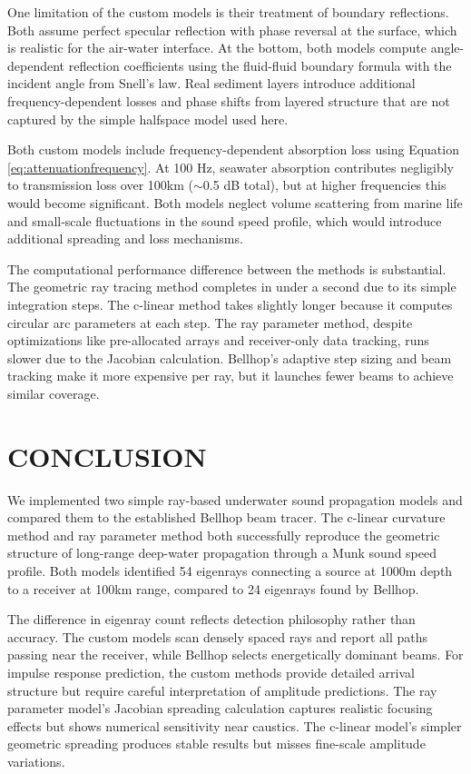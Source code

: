 \documentclass[fleqn]{jaes}
\begin{document}
One limitation of the custom models is their treatment of boundary reflections. Both assume perfect specular reflection with phase reversal at the surface, which is realistic for the air-water interface. At the bottom, both models compute angle-dependent reflection coefficients using the fluid-fluid boundary formula with the incident angle from Snell's law. Real sediment layers introduce additional frequency-dependent losses and phase shifts from layered structure that are not captured by the simple halfspace model used here.

Both custom models include frequency-dependent absorption loss using Equation \ref{eq:attenuationfrequency}. At 100 Hz, seawater absorption contributes negligibly to transmission loss over 100km ($\sim$0.5 dB total), but at higher frequencies this would become significant. Both models neglect volume scattering from marine life and small-scale fluctuations in the sound speed profile, which would introduce additional spreading and loss mechanisms.

The computational performance difference between the methods is substantial. The geometric ray tracing method completes in under a second due to its simple integration steps. The c-linear method takes slightly longer because it computes circular arc parameters at each step. The ray parameter method, despite optimizations like pre-allocated arrays and receiver-only data tracking, runs slower due to the Jacobian calculation. Bellhop's adaptive step sizing and beam tracking make it more expensive per ray, but it launches fewer beams to achieve similar coverage.

\section{CONCLUSION}

We implemented two simple ray-based underwater sound propagation models and compared them to the established Bellhop beam tracer. The c-linear curvature method and ray parameter method both successfully reproduce the geometric structure of long-range deep-water propagation through a Munk sound speed profile. Both models identified 54 eigenrays connecting a source at 1000m depth to a receiver at 100km range, compared to 24 eigenrays found by Bellhop.

The difference in eigenray count reflects detection philosophy rather than accuracy. The custom models scan densely spaced rays and report all paths passing near the receiver, while Bellhop selects energetically dominant beams. For impulse response prediction, the custom methods provide detailed arrival structure but require careful interpretation of amplitude predictions. The ray parameter model's Jacobian spreading calculation captures realistic focusing effects but shows numerical sensitivity near caustics. The c-linear model's simpler geometric spreading produces stable results but misses fine-scale amplitude variations.
\end{document}
